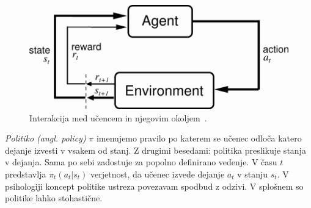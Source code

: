 \documentclass[a4paper, oneside, 12pt]{report}
\begin{document}
\begin{figure}[htbp]
\includegraphics[scale=1.0]{AgentEnvironment.png}
\caption{Interakcija med učencem in njegovim okoljem~\cite{ReinforcementLearningAnIntroduction}.}
\label{figure:AgentEnvironment}
\end{figure}

{\em Politiko (angl. policy)} $\pi$ imenujemo pravilo po katerem se učenec odloča katero dejanje izvesti v vsakem od stanj. Z drugimi besedami: politika preslikuje stanja v dejanja. Sama po sebi zadostuje za popolno definirano vedenje. V času $t$ predstavlja $\pi_t(a_t|s_t)$ verjetnost, da učenec izvede dejanje $a_t$ v stanju $s_t$. V psihologiji koncept politike ustreza povezavam spodbud z odzivi. V splošnem so politike lahko stohastične.
\end{document}
